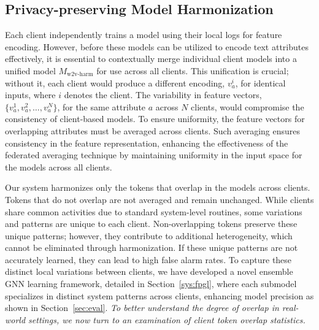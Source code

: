 \subsection{Privacy-preserving Model Harmonization}
\label{sub:model:harmonization}



Each client independently trains a \wordvec model using their local logs for feature encoding. However, before these models can be utilized to encode text attributes effectively, it is essential to contextually merge individual client \wordvec models into a unified model \( M_{\text{w2v-harm}} \) for use across all clients. This unification is crucial; without it, each client would produce a different encoding, \(v_a^i\), for identical inputs, where \(i\) denotes the client. The variability in feature vectors, \(\{v_a^1, v_a^2, \ldots, v_a^N\}\), for the same attribute \(a\) across \(N\) clients, would compromise the consistency of client-based \gnnshort models. To ensure uniformity, the feature vectors for overlapping attributes must be averaged across clients. Such averaging ensures consistency in the feature representation, enhancing the effectiveness of the federated averaging technique by maintaining uniformity in the input space for the \gnnshort models across all clients.

Our system harmonizes only the tokens that overlap in the \wordvec models across clients. Tokens that do not overlap are not averaged and remain unchanged. While clients share common activities due to standard system-level routines, some variations and patterns are unique to each client. Non-overlapping tokens preserve these unique patterns; however, they contribute to additional heterogeneity, which cannot be eliminated through harmonization. If these unique patterns are not accurately learned, they can lead to high false alarm rates. To capture these distinct local variations between clients, we have developed a novel ensemble GNN learning framework, detailed in Section~\ref{sys:fpgl}, where each submodel specializes in distinct system patterns across clients, enhancing model precision as shown in Section~\ref{sec:eval}.
\emph{To better understand the degree of overlap in real-world settings, we now turn to an examination of client token overlap statistics.}


